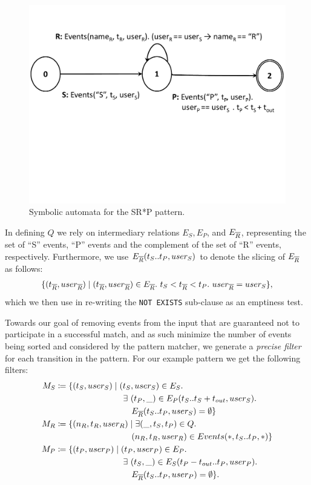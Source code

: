 \begin{figure}[t]
\centering
\includegraphics[clip, trim=0.5cm 10cm 0.5cm 3cm,width=\columnwidth]
{graphs/example_sm.pdf}
\caption{Symbolic automata for the SR*P pattern.}
\label{fig:srp_pattern}
\end{figure}

In defining $Q$ we rely on intermediary relations 
$E_S, E_P$, and $E_{\overline{R}}$, representing the set of ``S'' events, ``P'' events
and the complement of the set of ``R'' events, respectively.
Furthermore, we use $E_{\overline{R}}(t_S..t_P, user_S)$ to denote the slicing of
$E_{\overline{R}}$ as follows:
\begin{align*}
\{ (t_{\oR}, user_{\oR}) \mid 
   (t_{\oR}, user_{\oR}) \in E_{\oR} .\ 
   t_S < t_{\oR} < t_P .\ 
   user_{\oR} = user_S
\},
\end{align*}
which we then use in re-writing the \texttt{NOT EXISTS} sub-clause as an
emptiness test.


Towards our goal of removing events from the input that are guaranteed not to
participate in a successful match, and as such minimize the number of events
being sorted and considered by the pattern matcher, we
generate a {\em precise filter} for each transition in the pattern. 
For our example pattern we get the following filters:
\begin{align*}
M_S 
&\coloneq 
\{ (t_S, user_S) \mid 
   (t_S, user_S) \in E_S .\
\\
&\qqqquad 
   \exists\ (t_P, \_) \in E_P(t_S..t_S + t_{out}, user_S) .\ 
\\
&\qqqquad\quad
   E_{\oR}(t_S..t_P, user_S) = \emptyset 
\}
\\
M_R 
&\coloneq 
\{ (n_R, t_R, user_R) \mid 
   \exists (\_, t_S, t_P) \in Q .\ 
\\
&\qqqquad\quad
   (n_R, t_R, user_R) \in Events(*, t_S..t_P, *) 
\}
\\
M_P 
&\coloneq 
\{ (t_P, user_P) \mid  
   (t_P, user_P) \in E_P .\ 
\\
&\qqqquad
   \exists\ (t_S, \_) \in E_S(t_P-t_{out}..t_P, user_P) .\ 
\\
&\qqqquad\quad
   E_{\oR}(t_S..t_P, user_P) = \emptyset 
\}.
\end{align*}

